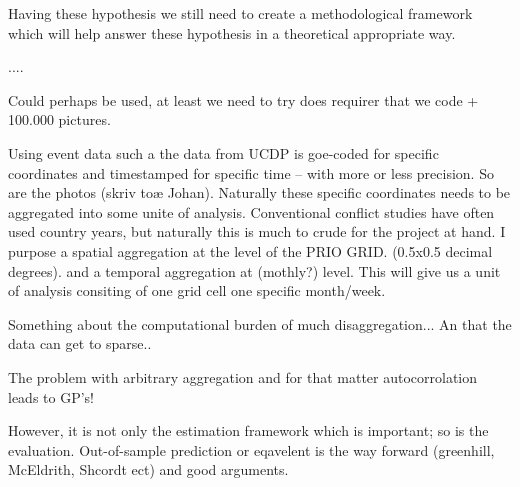 \documentclass[a4paper]{article}
\begin{document}
Having these hypothesis we still need to create a methodological framework which will help answer these hypothesis in a theoretical appropriate way.

....

Could perhaps be used, at least we need to try does requirer that we code + 100.000 pictures.

Using event data such a the data from UCDP is goe-coded for specific coordinates and timestamped for specific time -- with more or less precision. So are the photos (skriv toæ Johan). Naturally these specific coordinates needs to be aggregated into some unite of analysis. Conventional conflict studies have often used country years, but naturally this is much to crude for the project at hand. I purpose a spatial aggregation at the level of the PRIO GRID. (0.5x0.5 decimal degrees). and a temporal aggregation at (mothly?) level. This will give us a unit of analysis consiting of one grid cell one specific month/week. 

Something about the computational burden of much disaggregation... An that the data can get to sparse..

The problem with arbitrary aggregation and for that matter autocorrolation leads to GP's!


However, it is not only the estimation framework which is important; so is the evaluation. Out-of-sample prediction or eqavelent is the way forward (greenhill, McEldrith, Shcordt ect) and good arguments.






\end{document}
